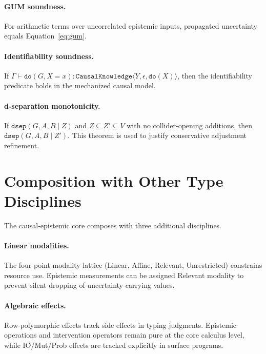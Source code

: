 \documentclass[acmsmall,screen,review,anonymous]{acmart}
\newcommand{\cknow}[3]{\texttt{CausalKnowledge}\langle #1, #2, #3 \rangle}
\newcommand{\eps}{\epsilon}
\begin{document}
\paragraph{GUM soundness.}
For arithmetic terms over uncorrelated epistemic inputs, propagated
uncertainty equals Equation~\eqref{eq:gum}.

\paragraph{Identifiability soundness.}
If $\Gamma \vdash \texttt{do}(G,X{=}x) : \cknow{Y}{\eps}{\texttt{do}(X)}$,
then the identifiability predicate holds in the mechanized causal model.

\paragraph{d-separation monotonicity.}
If $\texttt{dsep}(G,A,B \mid Z)$ and $Z \subseteq Z' \subseteq V$ with
no collider-opening additions, then $\texttt{dsep}(G,A,B \mid Z')$.
This theorem is used to justify conservative adjustment refinement.

\section{Composition with Other Type Disciplines}
\label{sec:composition}

The causal-epistemic core composes with three additional disciplines.

\paragraph{Linear modalities.}
The four-point modality lattice (Linear, Affine, Relevant,
Unrestricted) constrains resource use.
Epistemic measurements can be assigned Relevant modality to prevent
silent dropping of uncertainty-carrying values.

\paragraph{Algebraic effects.}
Row-polymorphic effects track side effects in typing judgments.
Epistemic operations and intervention operators remain pure at the core
calculus level, while IO/Mut/Prob effects are tracked explicitly in
surface programs.
\end{document}
